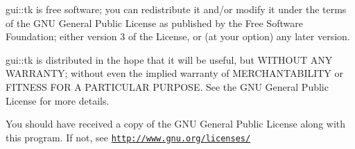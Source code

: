 gui\-::tk is free software; you can redistribute it and/or modify it under the terms of the G\-N\-U General Public License as published by the Free Software Foundation; either version 3 of the License, or (at your option) any later version.

gui\-::tk is distributed in the hope that it will be useful, but W\-I\-T\-H\-O\-U\-T A\-N\-Y W\-A\-R\-R\-A\-N\-T\-Y; without even the implied warranty of M\-E\-R\-C\-H\-A\-N\-T\-A\-B\-I\-L\-I\-T\-Y or F\-I\-T\-N\-E\-S\-S F\-O\-R A P\-A\-R\-T\-I\-C\-U\-L\-A\-R P\-U\-R\-P\-O\-S\-E. See the G\-N\-U General Public License for more details.

You should have received a copy of the G\-N\-U General Public License along with this program. If not, see \href{http://www.gnu.org/licenses/}{\tt http\-://www.\-gnu.\-org/licenses/} 